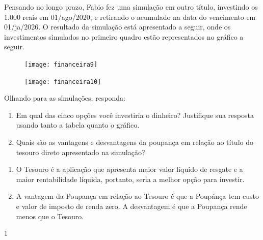 \begin{task}{}
Pensando no longo prazo, Fabio fez uma simulação em outro título, investindo os 1.000 reais em 01/ago/2020, e retirando o acumulado na data do vencimento em 01/ja/2026. O resultado da simulação está apresentado a seguir, onde os investimentos simulados no primeiro quadro estão representados no gráfico a seguir.

\begin{figure}[H]
\centering

\texttt{[image: financeira9]}

\texttt{[image: financeira10]}
\end{figure}

Olhando para as simulações, responda:
\begin{enumerate}
  \item Em qual das cinco opções você investiria o dinheiro? Justifique sua resposta usando tanto a tabela quanto o gráfico.
  \item Quais são as vantagens e desvantagens da poupança em relação ao título do tesouro direto apresentado na simulação?
\end{enumerate}
\end{task}
\begin{resposta}{}
{
  \begin{enumerate}
    \item O Tesouro é a aplicação que apresenta maior valor líquido de resgate e a maior rentabilidade líquida, portanto, seria a melhor opção para investir.
    \item A vantagem da Poupança em relação ao Tesouro é que a Poupánça tem custo e valor de imposto de renda zero. A desvantagem é que a Poupança rende menos que o Tesouro.
  \end{enumerate}
}{1}
\end{resposta}

